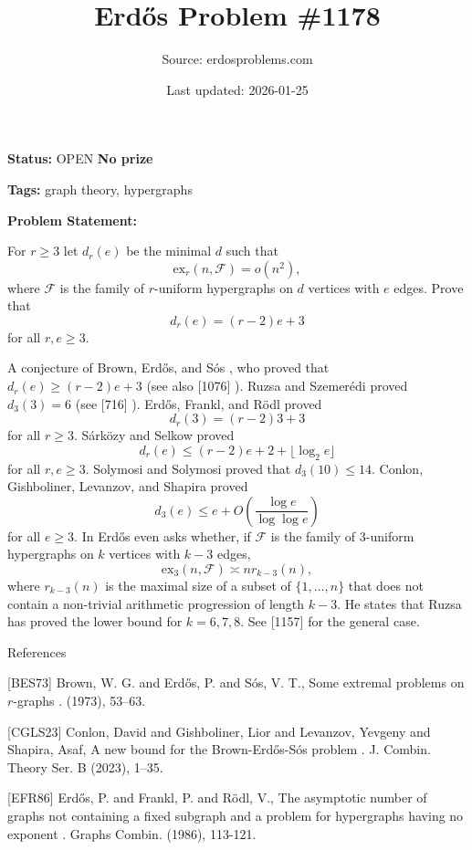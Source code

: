 \documentclass{article}
\title{Erd\H{o}s Problem \#1178}
\date{Last updated: 2026-01-25}
\author{Source: erdosproblems.com}
\begin{document}
\maketitle

\noindent\textbf{Status:} OPEN \quad \textbf{No prize}

\noindent\textbf{Tags:} graph theory, hypergraphs

\medskip

\noindent\textbf{Problem Statement:}

For $r\geq 3$ let $d_r(e)$ be the minimal $d$ such that\[\mathrm{ex}_r(n,\mathcal{F})=o(n^2),\]where $\mathcal{F}$ is the family of $r$-uniform hypergraphs on $d$ vertices with $e$ edges. Prove that\[d_r(e)=(r-2)e+3\]for all $r,e\geq 3$.




A conjecture of Brown, Erd\H{o}s, and S\'{o}s \cite{BES73}, who proved that $d_r(e)\geq (r-2)e+3$ (see also [1076] ). Ruzsa and Szemer\'{e}di \cite{RuSz78} proved $d_3(3)=6$ (see [716] ). Erd\H{o}s, Frankl, and R\"{o}dl \cite{EFR86} proved\[d_r(3)= (r-2)3+3\]for all $r\geq 3$. S\'{a}rk\"{o}zy and Selkow \cite{SaSe05} proved\[d_r(e) \leq (r-2)e+2+\lfloor \log_2 e\rfloor\]for all $r,e\geq 3$. Solymosi and Solymosi \cite{SoSo17} proved that $d_3(10)\leq 14$. Conlon, Gishboliner, Levanzov, and Shapira \cite{CGLS23} proved\[d_3(e)\leq e+O\left(\frac{\log e}{\log\log e}\right)\]for all $e\geq 3$. In \cite{Er75b} Erd\H{o}s even asks whether, if $\mathcal{F}$ is the family of $3$-uniform hypergraphs on $k$ vertices with $k-3$ edges,\[\mathrm{ex}_3(n,\mathcal{F})\asymp n r_{k-3}(n),\]where $r_{k-3}(n)$ is the maximal size of a subset of $\{1,\ldots,n\}$ that does not contain a non-trivial arithmetic progression of length $k-3$. He states that Ruzsa has proved the lower bound for $k=6,7,8$. See [1157] for the general case.




References

[BES73] Brown, W. G. and Erd\H{o}s, P. and S\'os, V. T., Some extremal problems on {$r$}-graphs . (1973), 53--63.

[CGLS23] Conlon, David and Gishboliner, Lior and Levanzov, Yevgeny and Shapira, Asaf, A new bound for the {B}rown-{E}rd\H os-S\'os problem . J. Combin. Theory Ser. B (2023), 1--35.

[EFR86] Erd\H{o}s, P. and Frankl, P. and R\"{o}dl, V., The asymptotic number of graphs not containing a fixed subgraph and a problem for hypergraphs having no exponent . Graphs Combin. (1986), 113-121.
\end{document}
